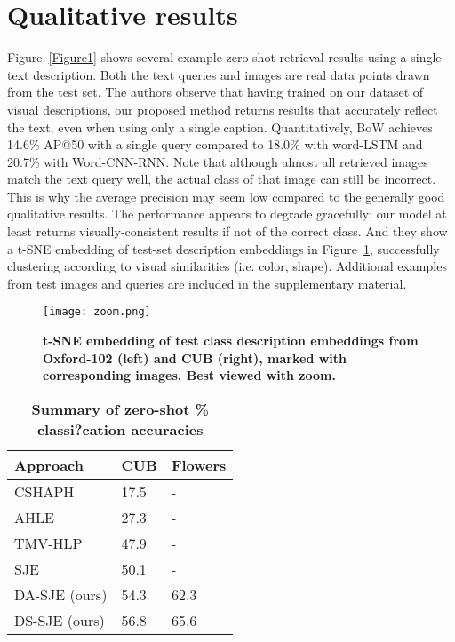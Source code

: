 \documentclass[10pt,twocolumn,letterpaper]{article}
\begin{document}
\section{Qualitative results}
Figure~\ref{Figure1} shows several example zero-shot retrieval results using a single text description. Both the text queries and images are real data points drawn from the test set. The authors observe that having trained on our dataset of visual descriptions, our proposed method returns results that accurately reflect the text, even when using only a single caption. Quantitatively, BoW achieves 14.6\% AP@50 with a single query compared to 18.0\% with word-LSTM and 20.7\% with Word-CNN-RNN. Note that although almost all retrieved images match the text query well, the actual class of that image can still be incorrect. This is why the average precision may seem low compared to the generally good qualitative results. The performance appears to degrade gracefully; our model at least returns visually-consistent results if not of the correct class. And they show a t-SNE embedding of test-set description embeddings in Figure~\ref{Figure2}, successfully clustering according to visual similarities (i.e. color, shape). Additional examples from test images and queries are included in the supplementary material.
 \begin{figure}[htbp]
 \centering
 \texttt{[image: zoom.png]}\\
 \caption{\textbf{t-SNE embedding of test class description embeddings from Oxford-102 (left) and CUB (right), marked with corresponding images. Best viewed with zoom.}}\label{Figure2}
\end{figure}
   \begin{table}[htbp]
  \centering
 \begin{tabular}{|p{2cm}|p{1cm}|p{1cm}|}
    \hline
     Approach & CUB & Flowers  \\
    \hline
     CSHAPH~\cite{name18} & 17.5 & -\\
    \hline
     AHLE~\cite{name1} & 27.3 & - \\
    \hline
     TMV-HLP~\cite{name14} & 47.9 & -\\
    \hline
     SJE~\cite{name2} & 50.1 & -\\
    \hline
     DA-SJE (ours) & 54.3 & 62.3 \\
    \hline
     DS-SJE (ours) & 56.8 & 65.6 \\
    \hline
  \end{tabular}
  \caption{\textbf{Summary of zero-shot {\%} classi?cation accuracies}}\label{Table2}
  \end{table}
\end{document}
